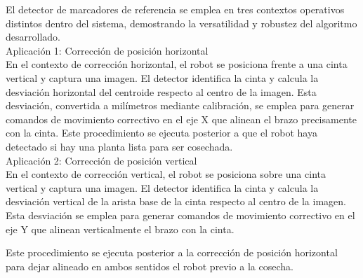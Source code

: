 El detector de marcadores de referencia se emplea en tres contextos operativos distintos dentro del sistema, demostrando la versatilidad y robustez del algoritmo desarrollado.\\

Aplicación 1: Corrección de posición horizontal\\
\noindent
En el contexto de corrección horizontal, el robot se posiciona frente a una cinta vertical y captura una imagen. El detector identifica la cinta y calcula la desviación horizontal del centroide respecto al centro de la imagen. Esta desviación, convertida a milímetros mediante calibración, se emplea para generar comandos de movimiento correctivo en el eje X que alinean el brazo precisamente con la cinta.
Este procedimiento se ejecuta posterior a que el robot haya detectado si hay una planta lista para ser cosechada.\\

Aplicación 2: Corrección de posición vertical\\
\noindent
En el contexto de corrección vertical, el robot se posiciona sobre una cinta vertical y captura una imagen. El detector identifica la cinta y calcula la desviación vertical de la arista base de la cinta respecto al centro de la imagen. Esta desviación se emplea para generar comandos de movimiento correctivo en el eje Y que alinean verticalmente el brazo con la cinta.

Este procedimiento se ejecuta posterior a la corrección de posición horizontal para dejar alineado en ambos sentidos el robot previo a la cosecha.

